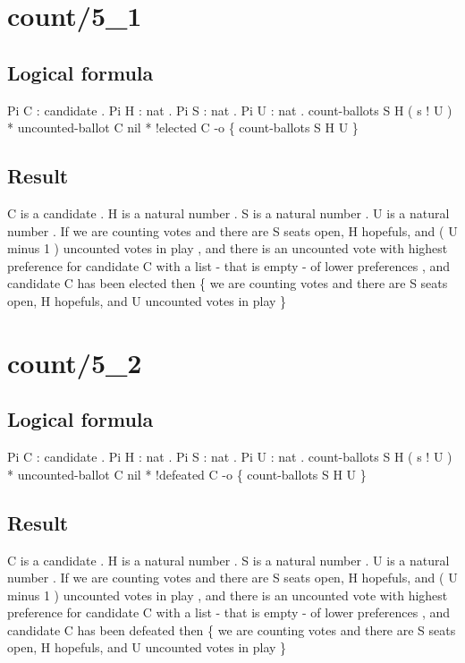 \section{count/5\_1}
\subsection{Logical formula}
\begin{texto2}
	Pi C : candidate . Pi H : nat . Pi S : nat . Pi U : nat . count-ballots S H ( s ! U ) * uncounted-ballot C nil * !elected C -o \{ count-ballots S H U \}
\end{texto2}

\subsection{Result}
\begin{texto2}
	C is a candidate . H is a natural number . S is a natural number . U is a natural number . If we are counting votes and there are S seats open, H hopefuls, and ( U minus 1 ) uncounted votes in play , and there is an uncounted vote with highest preference for candidate C with a list - that is empty - of lower preferences , and candidate C has been elected then \{ we are counting votes and there are S seats open, H hopefuls, and U uncounted votes in play \}
\end{texto2}

\section{count/5\_2}
\subsection{Logical formula}
\begin{texto2}
	Pi C : candidate . Pi H : nat . Pi S : nat . Pi U : nat . count-ballots S H ( s ! U ) * uncounted-ballot C nil * !defeated C -o \{ count-ballots S H U \}
\end{texto2}

\subsection{Result}
\begin{texto2}
	C is a candidate . H is a natural number . S is a natural number . U is a natural number . If we are counting votes and there are S seats open, H hopefuls, and ( U minus 1 ) uncounted votes in play , and there is an uncounted vote with highest preference for candidate C with a list - that is empty - of lower preferences , and candidate C has been defeated then \{ we are counting votes and there are S seats open, H hopefuls, and U uncounted votes in play \}
\end{texto2}

